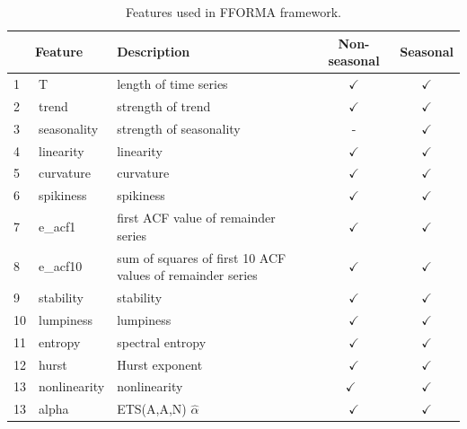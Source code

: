 \documentclass[11pt,a4paper,]{article}
\def\yes{$\checkmark$}
\theoremstyle{definition}
\theoremstyle{definition}
\theoremstyle{definition}
\theoremstyle{remark}
\begin{document}
\begin{table}[!htp]
\centering\footnotesize\tabcolsep=0.12cm
\caption{Features used in FFORMA framework.}
\label{feature}
\begin{tabular}{llp{}cc}
\toprule
\multicolumn{2}{c}{Feature} & Description & Non-seasonal & Seasonal\\
\midrule
1  & T              & length of time series                                                                   & \yes  & \yes \\
2  & trend          & strength of trend                                                                       & \yes  & \yes\\
3  & seasonality   & strength of seasonality                                                                 & -     & \yes \\
4  & linearity      & linearity                                                                               & \yes  & \yes \\
5  & curvature      & curvature                                                                               & \yes  & \yes \\
6  & spikiness      & spikiness                                                                               & \yes  & \yes \\
7  & e\_acf1        & first ACF value of remainder series                                                     & \yes  & \yes \\
8  & e\_acf10        & sum of squares of first 10 ACF values of remainder series                                                    & \yes  & \yes \\
9  & stability      & stability                                                                               & \yes  & \yes \\
10  & lumpiness      & lumpiness                                                                               & \yes  & \yes \\
11 & entropy        & spectral entropy                                                                        & \yes  & \yes \\
12 & hurst          & Hurst exponent                                                                          & \yes  & \yes \\
13 & nonlinearity   & nonlinearity                                                                            & \yes\ & \yes \\
13 & alpha          & ETS(A,A,N) $\hat\alpha$                                                                 & \yes  & \yes \\

\end{tabular}
\end{table}
\end{document}

